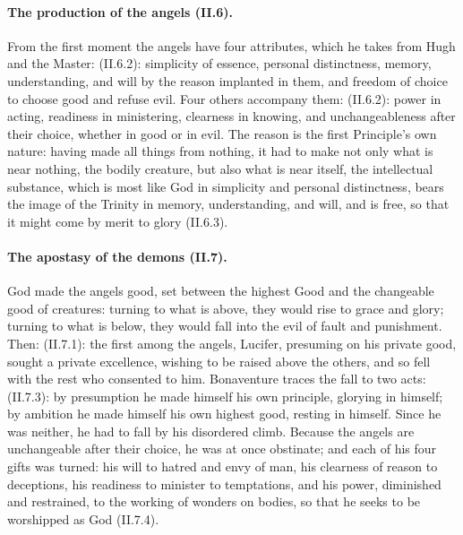 \paragraph{The production of the angels (II.6).} From the first moment the
angels have four attributes, which he takes from Hugh and the Master:
 (II.6.2): simplicity of essence, personal distinctness,
memory, understanding, and will by the reason implanted in them, and freedom
of choice to choose good and refuse evil. Four others accompany them:
 (II.6.2): power in acting, readiness in ministering, clearness in
knowing, and unchangeableness after their choice, whether in good or in
evil. The reason is the first Principle's own nature: having made all things
from nothing, it had to make not only what is near nothing, the bodily
creature, but also what is near itself, the intellectual substance, which is
most like God in simplicity and personal distinctness, bears the image of
the Trinity in memory, understanding, and will, and is free, so that it
might come by merit to glory (II.6.3).

\paragraph{The apostasy of the demons (II.7).} God made the angels good,
set between the highest Good and the changeable good of creatures:
turning to what is above, they would rise to grace and glory; turning to
what is below, they would fall into the evil of fault and punishment. Then:
 (II.7.1): the first among the angels, Lucifer,
presuming on his private good, sought a private excellence, wishing to be
raised above the others, and so fell with the rest who consented to him.
Bonaventure traces the fall to two acts:  (II.7.3): by presumption he made
himself his own principle, glorying in himself; by ambition he made himself
his own highest good, resting in himself. Since he was neither, he had to
fall by his disordered climb. Because the angels are unchangeable after
their choice, he was at once obstinate; and each of his four gifts was
turned: his will to hatred and envy of man, his clearness of reason to
deceptions, his readiness to minister to temptations, and his power,
diminished and restrained, to the working of wonders on bodies, so that he
seeks to be worshipped as God (II.7.4).

